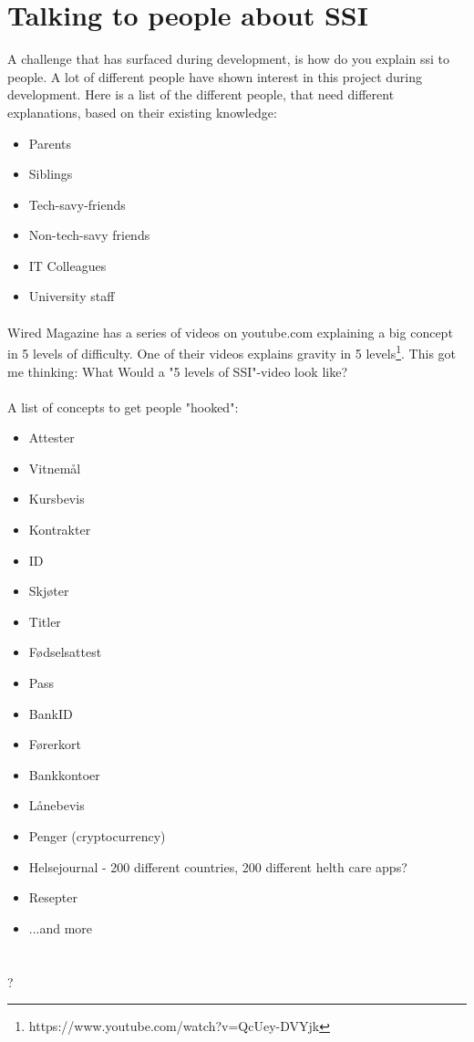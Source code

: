 \section{Talking to people about SSI}

A challenge that has surfaced during development, is how do you explain \acrshort{ssi} to people. A lot of different people have shown interest in this project during development. Here is a list of the different people, that need different explanations, based on their existing knowledge:

\begin{itemize}
    \item Parents
    \item Siblings
    \item Tech-savy-friends
    \item Non-tech-savy friends
    \item IT Colleagues
    \item University staff
\end{itemize}

\paragraph{}
Wired Magazine has a series of videos on youtube.com explaining a big concept in 5 levels of difficulty. One of their videos explains gravity in 5 levels\footnote{https://www.youtube.com/watch?v=QcUey-DVYjk}. This got me thinking: What Would a "5 levels of SSI"-video look like?

\paragraph{}
A list of concepts to get people "hooked":
\begin{itemize}
    \item Attester
    \item Vitnemål
    \item Kursbevis
    \item Kontrakter
    \item ID
    \item Skjøter
    \item Titler
    \item Fødselsattest
    \item Pass
    \item BankID
    \item Førerkort
    \item Bankkontoer
    \item Lånebevis
    \item Penger (cryptocurrency)
    \item Helsejournal - 200 different countries, 200 different helth care apps?
    \item Resepter
    \item ...and more
\end{itemize}


\section{}

?